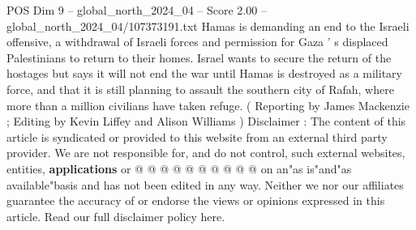 \begin{textsample}{POS Dim 9 – global\_north\_2024\_04 – Score 2.00 – global\_north\_2024\_04/107373191.txt}
Hamas is demanding an end to the Israeli offensive, a withdrawal of Israeli forces and permission for Gaza ' s displaced Palestinians to return to their homes.
Israel wants to secure the return of the hostages but says it will not end the war until Hamas is destroyed as a military force, and that it is still planning to assault the southern city of Rafah, where more than a million civilians have taken refuge. ( Reporting by James Mackenzie ; Editing by Kevin Liffey and Alison Williams ) Disclaimer : The content of this article is syndicated or provided to this website from an external third party provider.
We are not responsible for, and do not control, such external websites, entities, \textbf{applications} or @ @ @ @ @ @ @ @ @ @ on an"as is"and"as available"basis and has not been edited in any way.
Neither we nor our affiliates guarantee the accuracy of or endorse the views or opinions expressed in this article.
Read our full disclaimer policy here.

\end{textsample}
